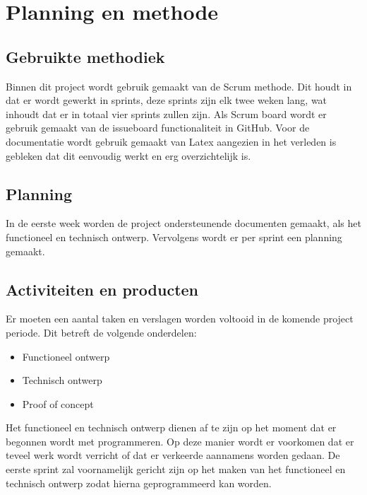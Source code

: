 \section{Planning en methode}

\subsection{Gebruikte methodiek}
Binnen dit project wordt gebruik gemaakt van de Scrum methode. Dit houdt
in dat er wordt gewerkt in sprints, deze sprints zijn elk twee
weken lang, wat inhoudt dat er in totaal vier sprints zullen zijn. Als
Scrum board wordt er gebruik gemaakt van de issueboard functionaliteit
in GitHub. Voor de documentatie wordt gebruik gemaakt van Latex aangezien
in het verleden is gebleken dat dit eenvoudig werkt en erg overzichtelijk is.


\subsection{Planning}
In de eerste week worden de project ondersteunende documenten gemaakt, als het
functioneel en technisch ontwerp. Vervolgens wordt er per sprint een planning
gemaakt.

\subsection{Activiteiten en producten}
Er moeten een aantal taken en verslagen worden voltooid in de komende
project periode. Dit betreft de volgende onderdelen:
\begin{itemize}
  	\item Functioneel ontwerp
  	\item Technisch ontwerp
	\item Proof of concept
\end{itemize}
Het functioneel en technisch ontwerp dienen af te zijn op het moment dat 
er begonnen wordt met programmeren. Op deze manier wordt er voorkomen 
dat er teveel werk wordt verricht of dat er verkeerde aannamens worden 
gedaan. De eerste sprint zal voornamelijk gericht zijn op het maken van 
het functioneel en technisch ontwerp zodat hierna geprogrammeerd kan
worden.

	
